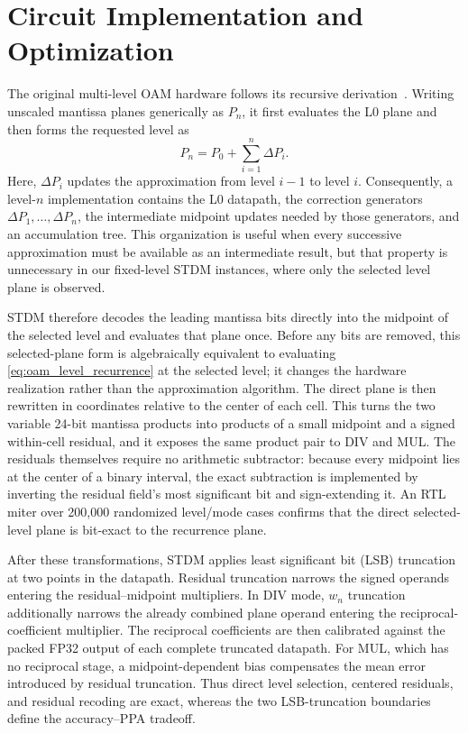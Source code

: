 \documentclass[conference]{IEEEtran}
\begin{document}
\section{Circuit Implementation and Optimization}
The original multi-level OAM hardware follows its recursive
derivation~\cite{chen2020oam}. Writing unscaled mantissa planes
generically as $P_n$, it first evaluates the L0 plane and then forms the
requested level as
\begin{equation}
    P_n = P_0 + \sum_{i=1}^{n}\Delta P_i .
    \label{eq:oam_level_recurrence}
\end{equation}
Here, $\Delta P_i$
updates the approximation from level $i-1$ to level $i$. Consequently, a
level-$n$ implementation contains
the L0 datapath, the correction generators $\Delta P_1,\ldots,\Delta P_n$, the
intermediate midpoint updates needed by those generators, and an accumulation
tree. This organization is useful when every successive approximation must be
available as an intermediate result, but that property is unnecessary in our
fixed-level STDM instances, where only the selected level plane is observed.

STDM therefore decodes the leading mantissa bits directly into the midpoint of
the selected level and evaluates that plane once. Before any bits are removed,
this selected-plane form is algebraically equivalent to evaluating
\eqref{eq:oam_level_recurrence} at the selected level; it changes the hardware
realization rather than the approximation algorithm. The direct plane is then
rewritten in coordinates relative to the center of each cell. This turns the two variable 24-bit mantissa products into products of a small
midpoint and a signed within-cell residual, and it exposes the same product
pair to DIV and MUL. The residuals themselves require no arithmetic
subtractor: because every midpoint lies at the center of a binary interval,
the exact subtraction is implemented by inverting the residual field's most
significant bit and sign-extending it.
An RTL miter over 200,000 randomized level/mode cases confirms that the direct
selected-level plane is bit-exact to the recurrence plane.

After these transformations, STDM applies least significant bit (LSB)
truncation at two points in the datapath. Residual truncation narrows
the signed operands entering the residual--midpoint multipliers. In DIV mode,
$w_n$ truncation additionally narrows the already combined plane operand
entering the reciprocal-coefficient multiplier. The reciprocal coefficients are then
calibrated against the packed FP32 output of each complete truncated datapath.
For MUL, which has no reciprocal stage, a midpoint-dependent bias
compensates the mean error introduced by residual truncation. Thus direct
level selection, centered residuals, and residual recoding are exact, whereas
the two LSB-truncation boundaries define the accuracy--PPA tradeoff.
\end{document}
